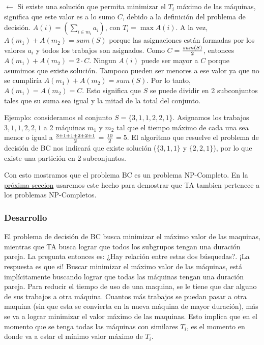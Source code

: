 \documentclass{article}
\begin{document}
$\leftarrow$ Si existe una solución que permita minimizar el $T_i$ máximo de las máquinas, significa que este valor es a lo sumo $C$, debido a la definición del problema de decisión. $ A(i) = (\displaystyle{\sum_{i \in m_i} a_i})$, con $T_i = \max A(i)$. A la vez, $A(m_1) + A(m_2) = sum(S)$ porque las asignaciones están formadas por los valores $a_i$ y todos los trabajos son asignados. Como $C =$$ sum(S) \over2$, entonces $A(m_1) + A(m_2) = 2 \cdot C$. Ningun $A(i)$ puede ser mayor a $C$ porque asumimos que existe solución. Tampoco pueden ser menores a ese valor ya que no se cumpliría $A(m_1) + A(m_2) = sum(S)$. Por lo tanto, $A(m_1) = A(m_2) = C$. Esto significa que $S$ se puede dividir en 2 subconjuntos tales que su suma sea igual y la mitad de la total del conjunto.

Ejemplo: consideramos el conjunto \(S = \{3, 1, 1, 2, 2, 1\}\). Asignamos los trabajos ${3, 1, 1, 2, 2, 1}$ a 2 máquinas $m_1$ y $m_2$ tal que el tiempo máximo de cada una sea menor o igual a $3 + 1 + 1 + 2 + 2 + 1\over2$$ =$$ 10\over2 $$= 5$. El algoritmo que resuelve el problema de decisión de BC nos indicará que existe solución ($\{3, 1, 1\}$ y $\{2, 2, 1\}$), por lo que existe una partición en 2 subconjuntos.

Con esto mostramos que el problema BC es un problema NP-Completo. En la \hyperref[sec:np-completo-bc-desarrollo]{próxima seccion} usaremos este hecho para demostrar que TA tambien pertenece a los problemas NP-Completos.


\subsubsection{Desarrollo}
\label{sec:np-completo-bc-desarrollo}
El problema de decisión de BC busca minimizar el máximo valor de las maquinas, mientras que TA busca lograr que todos los subgrupos tengan una duración pareja. La pregunta entonces es: ¿Hay relación entre estas dos búsquedas?. ¡La respuesta es que si! Buscar minimizar el máximo valor de las máquinas, está implícitamente buscando lograr que todas las máquinas tengan una duración pareja.
Para reducir el tiempo de uso de una maquina, se le tiene que dar alguno de sus trabajos a otra máquina. Cuantos más trabajos se puedan pasar a otra maquina (sin que esta se convierta en la nueva máquina de mayor duración), más se va a lograr minimizar el valor máximo de las maquinas.
Esto implica que en el momento que se tenga todas las máquinas con similares $T_i$, es el momento en donde va a estar el mínimo valor máximo de $T_i$. 
\end{document}

